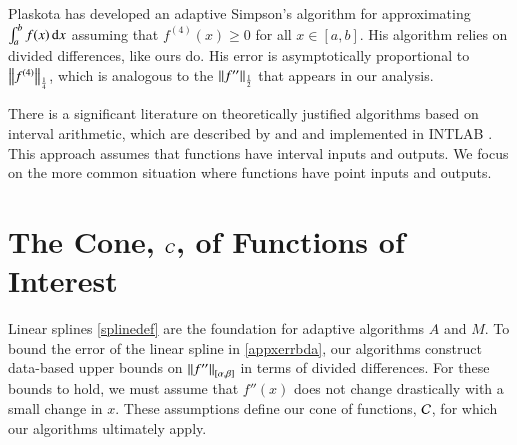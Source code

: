 \documentclass[review]{elsarticle}
\theoremstyle{definition}
\begin{document}
Plaskota \cite{Pla15a} has developed an adaptive Simpson's algorithm for
approximating $\int_a^b f(x) \, \dif x$ assuming that $f^{(4)}(x) \ge 0$ for all
$x \in [a,b]$. His algorithm relies on divided differences, like ours do. His
error is asymptotically proportional to $\norm[\frac14]{f^{(4)}}$, which is
analogous to the $\norm[\frac12]{f''}$ that appears in our analysis.

There is a significant literature on theoretically justified algorithms based on
interval arithmetic, which are described by \cite{MoKeCl09} and \cite{Rum10a}
and implemented in INTLAB \cite{Rum99a}. This approach assumes that functions
have interval inputs and outputs. We focus on the more common situation where
functions have point inputs and outputs.

\section{The Cone, $\cc$, of Functions of Interest} \label{sec:cone}

Linear splines \eqref{splinedef} are the foundation for adaptive algorithms $A$ and $M$. 
To bound the error of the linear spline in \eqref{appxerrbda}, our algorithms construct
data-based upper bounds on $\norm[{[\alpha, \beta]}]{f''}$ in terms of  divided differences. For
these bounds to hold, we must assume that $f''(x)$ does not change drastically
with a small change in $x$. These assumptions define our cone of functions, $\cc$, for
which our algorithms ultimately apply.
\end{document}
